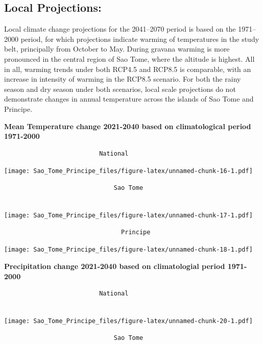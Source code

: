 \documentclass[
]{book}
\begin{document}
\hypertarget{local-projections}{%
\subsection{Local Projections:}\label{local-projections}}

Local climate change projections for the 2041--2070 period is based on the 1971--2000 period, for which projections indicate warming of temperatures in the study belt, principally from October to May. During gravana warming is more pronounced in the central region of Sao Tome, where the altitude is highest. All in all, warming trends under both RCP4.5 and RCP8.5 is comparable, with an increase in intensity of warming in the RCP8.5 scenario. For both the rainy season and dry season under both scenarios, local scale projections do not demonstrate changes in annual temperature across the islands of Sao Tome and Principe.

\textbf{Mean Temperature change 2021-2040 based on climatological period 1971-2000}

\begin{verbatim}
                          National 
\end{verbatim}

\texttt{[image: Sao\_Tome\_Principe\_files/figure-latex/unnamed-chunk-16-1.pdf]}

\begin{verbatim}
                              Sao Tome 
                              
\end{verbatim}

\texttt{[image: Sao\_Tome\_Principe\_files/figure-latex/unnamed-chunk-17-1.pdf]}

\begin{verbatim}
                                Principe
\end{verbatim}

\texttt{[image: Sao\_Tome\_Principe\_files/figure-latex/unnamed-chunk-18-1.pdf]}

\textbf{Precipitation change 2021-2040 based on climatologial period 1971-2000}

\begin{verbatim}
                          National
                          
\end{verbatim}

\texttt{[image: Sao\_Tome\_Principe\_files/figure-latex/unnamed-chunk-20-1.pdf]}

\begin{verbatim}
                              Sao Tome
\end{verbatim}
\end{document}
